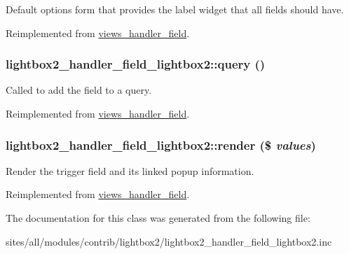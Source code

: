 Default options form that provides the label widget that all fields should have. 

Reimplemented from \hyperlink{classviews__handler__field_0435d161922b7b4b84f02a2e79bb947a}{views\_\-handler\_\-field}.\hypertarget{classlightbox2__handler__field__lightbox2_be83b39eb7bab1582a1038543f59e277}{
\subsubsection[{query}]{\setlength{\rightskip}{0pt plus 5cm}lightbox2\_\-handler\_\-field\_\-lightbox2::query ()}}
\label{classlightbox2__handler__field__lightbox2_be83b39eb7bab1582a1038543f59e277}


Called to add the field to a query. 

Reimplemented from \hyperlink{classviews__handler__field_4f661f91bcbe80d4a00c30a31456c502}{views\_\-handler\_\-field}.\hypertarget{classlightbox2__handler__field__lightbox2_141baaefa052c49b0084cd88dc3d50ce}{
\subsubsection[{render}]{\setlength{\rightskip}{0pt plus 5cm}lightbox2\_\-handler\_\-field\_\-lightbox2::render (\$ {\em values})}}
\label{classlightbox2__handler__field__lightbox2_141baaefa052c49b0084cd88dc3d50ce}


Render the trigger field and its linked popup information. 

Reimplemented from \hyperlink{classviews__handler__field_82ff951c5e9ceb97b2eab86f880cbc1e}{views\_\-handler\_\-field}.

The documentation for this class was generated from the following file:\begin{CompactItemize}
\item 
sites/all/modules/contrib/lightbox2/lightbox2\_\-handler\_\-field\_\-lightbox2.inc\end{CompactItemize}
